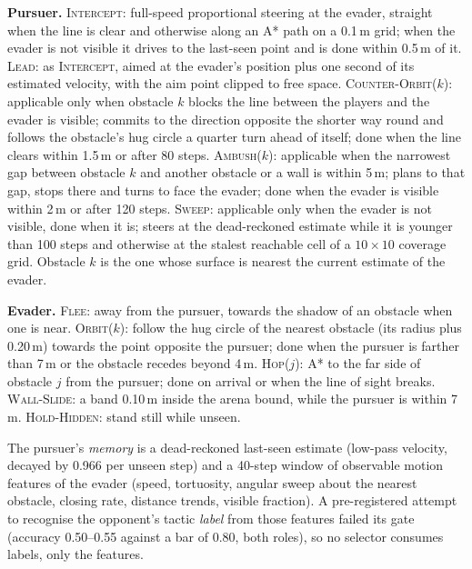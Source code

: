 \documentclass[conference]{IEEEtran}
\newcommand{\pol}[1]{\textsc{#1}}
\begin{document}
\textbf{Pursuer.}
\pol{Intercept}: full-speed proportional steering at the evader, straight when the line is clear and otherwise along an A* path on a 0.1\,m grid; when the evader is not visible it drives to the last-seen point and is done within 0.5\,m of it.
\pol{Lead}: as \pol{Intercept}, aimed at the evader's position plus one second of its estimated velocity, with the aim point clipped to free space.
\pol{Counter-Orbit}($k$): applicable only when obstacle $k$ blocks the line between the players and the evader is visible; commits to the direction opposite the shorter way round and follows the obstacle's hug circle a quarter turn ahead of itself; done when the line clears within 1.5\,m or after 80 steps.
\pol{Ambush}($k$): applicable when the narrowest gap between obstacle $k$ and another obstacle or a wall is within 5\,m; plans to that gap, stops there and turns to face the evader; done when the evader is visible within 2\,m or after 120 steps.
\pol{Sweep}: applicable only when the evader is not visible, done when it is; steers at the dead-reckoned estimate while it is younger than 100 steps and otherwise at the stalest reachable cell of a $10\times10$ coverage grid.
Obstacle $k$ is the one whose surface is nearest the current estimate of the evader.

\textbf{Evader.}
\pol{Flee}: away from the pursuer, towards the shadow of an obstacle when one is near.
\pol{Orbit}($k$): follow the hug circle of the nearest obstacle (its radius plus 0.20\,m) towards the point opposite the pursuer; done when the pursuer is farther than 7\,m or the obstacle recedes beyond 4\,m.
\pol{Hop}($j$): A* to the far side of obstacle $j$ from the pursuer; done on arrival or when the line of sight breaks.
\pol{Wall-Slide}: a band 0.10\,m inside the arena bound, while the pursuer is within 7\,m.
\pol{Hold-Hidden}: stand still while unseen.

The pursuer's \emph{memory} is a dead-reckoned last-seen estimate (low-pass velocity, decayed by 0.966 per unseen step) and a 40-step window of observable motion features of the evader (speed, tortuosity, angular sweep about the nearest obstacle, closing rate, distance trends, visible fraction). A pre-registered attempt to recognise the opponent's tactic \emph{label} from those features failed its gate (accuracy 0.50--0.55 against a bar of 0.80, both roles), so no selector consumes labels, only the features.
\end{document}
